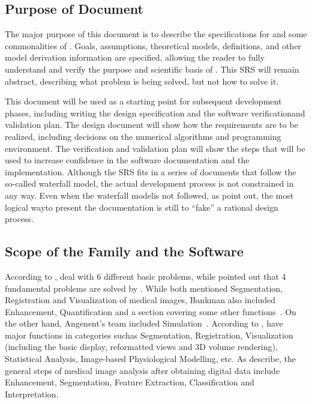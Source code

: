 \documentclass[12pt]{article}
\begin{document}
\subsection{Purpose of Document}

The major purpose of this document is to describe the specifications for
\progname and some commonalities of \famname. Goals, assumptions, theoretical
models, definitions, and other model derivation information are specified,
allowing the reader to fully understand and verify the purpose and scientific
basis of \famname. This SRS will remain abstract, describing what problem is
being solved, but not how to solve it.

This document will be used as a starting point for subsequent development
phases, including writing the design specification and the software
verificationand validation plan. The design document will show how the
requirements are to
be realized, including decisions
on the numerical algorithms and programming environment. The verification and
validation plan will show the steps that will be used to increase confidence in
the software documentation and the implementation. Although the SRS fits in a
series of documents that follow the so-called waterfall model, the actual
development process is not constrained in any way. Even when the waterfall
modelis not followed, as \cite{ParnasAndClements1986} point out, the most
logical wayto present the documentation is still to “fake” a rational design
process.

\subsection{Scope of the Family and the Software} 

According to \cite{Bankman2000}, \famname{} deal with 6 different basic
problems, while \cite{Angenent2006} pointed out that 4 fundamental problems are
solved by \famname. While both mentioned Segmentation, Registration and
Visualization of medical images, Bankman also included Enhancement,
Quantification and a section covering some other functions~\cite{Bankman2000}.
On the other hand, Angenent's team included Simulation~\cite{Angenent2006}.
According to \cite{wiki:001}, \famname{} have major functions in categories
suchas Segmentation, Registration, Visualization (including the basic display,
reformatted views and 3D volume rendering), Statistical Analysis, Image-based
Physiological Modelling, etc. As \cite{Kim2011} describe, the general steps of
medical image analysis after obtaining digital data include Enhancement,
Segmentation, Feature Extraction, Classification and Interpretation.
\end{document}
